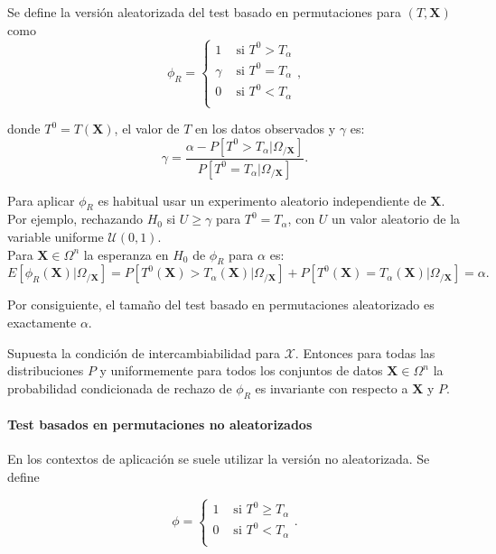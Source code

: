 	Se define la versión aleatorizada del test basado en permutaciones para $(T, \mathbf{X})$ como 
	\[ 
		\phi_R = \left\lbrace \begin{array}{cc}
			1 		& \text{ si } T^0 > T_\alpha \\
			\gamma 	& \text{ si } T^0 = T_\alpha \\
			0		& \text{ si } T^0 < T_\alpha \\
		\end{array} \right. ,
	\]
	
	donde $T^0 = T(\mathbf{X})$, el valor de $T$ en los datos observados y $\gamma$ es:
	\[
		\gamma = \frac{\alpha - P[T^0 > T_\alpha | 
								\Omega_{/\mathbf{X}}]}
					  {P[T^0 = T_\alpha | 
								\Omega_{/\mathbf{X}}]} .
	\]
	
	Para aplicar $\phi_R$ es habitual usar un experimento aleatorio independiente de $\mathbf{X}$. Por ejemplo, rechazando $H_0$ si $U \geq \gamma$ para $T^0 = T_\alpha$, con $U$ un valor aleatorio de la variable uniforme $\mathcal{U}(0,1)$.\\
	Para $\mathbf{X} \in \Omega^n$ la esperanza en $H_0$ de $\phi_R$ para $\alpha$ es:
	\[ 
		E[ \phi_R(\mathbf{X}) | \Omega_{/\mathbf{X}}] =
			P[ T^0(\mathbf{X}) > T_\alpha(\mathbf{X}) | 
								\Omega_{/\mathbf{X}}] + 
			P[ T^0(\mathbf{X}) = T_\alpha(\mathbf{X}) | 
								\Omega_{/\mathbf{X}}] =
			\alpha .
	\]
	
	Por consiguiente, el tamaño del test basado en permutaciones aleatorizado es exactamente $\alpha$.
	
\begin{proposicion}
	Supuesta la condición de intercambiabilidad para $\mathcal{X}$. Entonces para todas las distribuciones $P$ y uniformemente para todos los conjuntos de datos $\mathbf{X} \in \Omega^n$ la probabilidad condicionada de rechazo de $\phi_R$ es invariante con respecto a $\mathbf{X}$ y $P$.
\end{proposicion}

\paragraph{Test basados en permutaciones no aleatorizados}

	En los contextos de aplicación se suele utilizar la versión no aleatorizada. Se define
	
	\[ 
		\phi = \left\lbrace \begin{array}{cc}
			1 		& \text{ si } T^0 \geq T_\alpha \\
			0		& \text{ si } T^0 < T_\alpha \\
		\end{array} \right. .
	\]
	
